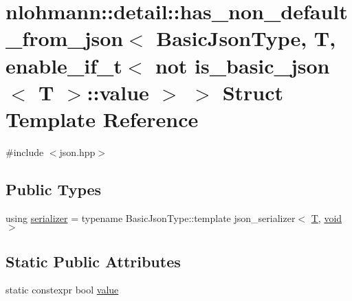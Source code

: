 \hypertarget{structnlohmann_1_1detail_1_1has__non__default__from__json_3_01_basic_json_type_00_01_t_00_01enab81bd4c814ac1146ff15f3f4636933207}{}\section{nlohmann\+::detail\+::has\+\_\+non\+\_\+default\+\_\+from\+\_\+json$<$ Basic\+Json\+Type, T, enable\+\_\+if\+\_\+t$<$ not is\+\_\+basic\+\_\+json$<$ T $>$\+::value $>$ $>$ Struct Template Reference}
\label{structnlohmann_1_1detail_1_1has__non__default__from__json_3_01_basic_json_type_00_01_t_00_01enab81bd4c814ac1146ff15f3f4636933207}


{\ttfamily \#include $<$json.\+hpp$>$}

\subsection*{Public Types}
\begin{DoxyCompactItemize}
\item 
using \mbox{\hyperlink{structnlohmann_1_1detail_1_1has__non__default__from__json_3_01_basic_json_type_00_01_t_00_01enab81bd4c814ac1146ff15f3f4636933207_a610272ed924122e0c46d158ecdfe6faf}{serializer}} = typename Basic\+Json\+Type\+::template json\+\_\+serializer$<$ \mbox{\hyperlink{_keyboard_event_8h_adf1f3edb9115acb0a1e04209b7a9937b}{T}}, \mbox{\hyperlink{namespacenlohmann_1_1detail_a59fca69799f6b9e366710cb9043aa77d}{void}} $>$
\end{DoxyCompactItemize}
\subsection*{Static Public Attributes}
\begin{DoxyCompactItemize}
\item 
static constexpr bool \mbox{\hyperlink{structnlohmann_1_1detail_1_1has__non__default__from__json_3_01_basic_json_type_00_01_t_00_01enab81bd4c814ac1146ff15f3f4636933207_a1494ac5fed1163aab4a89208ff04ee85}{value}}
\end{DoxyCompactItemize}


